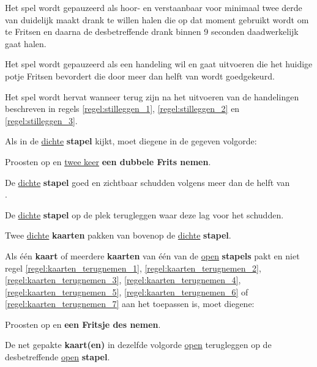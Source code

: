 \vervolgLijst{}
\item Het spel wordt gepauzeerd als \eenSpeler hoor- en verstaanbaar voor minimaal twee derde van \alleSpelers duidelijk maakt drank te willen halen die op dat moment gebruikt wordt om te Fritsen en daarna de desbetreffende drank binnen 9 seconden daadwerkelijk gaat halen.
\label{regel:stilleggen_2}
\eindLijst{}

\vervolgLijst{}
\item Het spel wordt gepauzeerd als \eenSpeler een handeling wil en gaat uitvoeren die het huidige potje Fritsen bevordert die door meer dan helft van \alleSpelers wordt goedgekeurd.
\label{regel:stilleggen_3}
\eindLijst{}

\vervolgLijst{}
\item Het spel wordt hervat wanneer \alleSpelers terug zijn na het uitvoeren van de handelingen beschreven in regels \ref{regel:stilleggen_1}, \ref{regel:stilleggen_2} en \ref{regel:stilleggen_3}.
\label{regel:stilleggen_4}
\eindLijst{}


\vervolgLijst{}
\item Als \eenSpeler in de \ul{dichte} \textbf{stapel} kijkt, moet diegene in de gegeven volgorde:
\puntLijst{}
\item Proosten op  en \ul{twee keer} \textbf{een dubbele Frits nemen}\footnotemark[1].
\item De \ul{dichte} \textbf{stapel} goed en zichtbaar schudden volgens meer dan de helft van \\ \alleSpelersN.
\item De \ul{dichte} \textbf{stapel} op de plek terugleggen waar deze lag voor het schudden.
\item Twee \ul{dichte} \textbf{kaarten} pakken van bovenop de \ul{dichte} \textbf{stapel}.
\eindPuntLijst{}
\label{regel:kijken_in_dichte_stapel}
\eindLijst{}

\vervolgLijst{}
\item Als \eenSpeler één \textbf{kaart} of meerdere \textbf{kaarten} van één van de \ul{open} \textbf{stapels} pakt en niet regel \ref{regel:kaarten_terugnemen_1}, \ref{regel:kaarten_terugnemen_2}, \ref{regel:kaarten_terugnemen_3}, \ref{regel:kaarten_terugnemen_4}, \ref{regel:kaarten_terugnemen_5}, \ref{regel:kaarten_terugnemen_6} of \ref{regel:kaarten_terugnemen_7} aan het toepassen is, moet diegene:
\puntLijst{}
\item Proosten op  en \textbf{een Fritsje des nemen}\footnotemark[2].
\item De net gepakte \textbf{kaart(en)} in dezelfde volgorde \ul{open} terugleggen op de desbetreffende \ul{open} \textbf{stapel}.
\eindPuntLijst{}
\eindLijst{}

